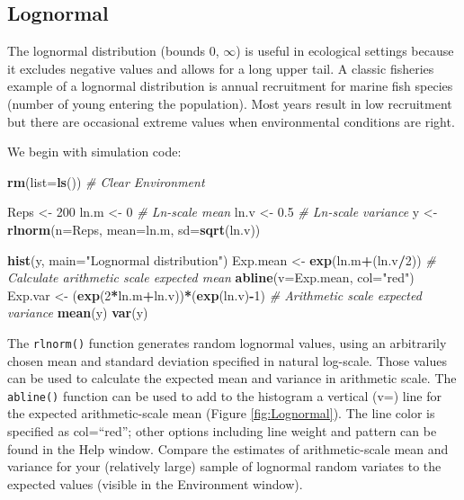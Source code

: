 \documentclass[
]{krantz}
\makeatletter
\newenvironment{Shaded}{\begin{snugshade}}{\end{snugshade}}
\newcommand{\AttributeTok}[1]{\textcolor[rgb]{0.27,0.27,0.27}{#1}}
\newcommand{\CommentTok}[1]{\textcolor[rgb]{0.37,0.37,0.37}{\textit{#1}}}
\newcommand{\DecValTok}[1]{\textcolor[rgb]{0.06,0.06,0.06}{#1}}
\newcommand{\FloatTok}[1]{\textcolor[rgb]{0.06,0.06,0.06}{#1}}
\newcommand{\FunctionTok}[1]{\textcolor[rgb]{0.27,0.27,0.27}{\textbf{#1}}}
\newcommand{\NormalTok}[1]{#1}
\newcommand{\OtherTok}[1]{\textcolor[rgb]{0.37,0.37,0.37}{#1}}
\newcommand{\SpecialCharTok}[1]{\textcolor[rgb]{0.43,0.43,0.43}{\textbf{#1}}}
\newcommand{\StringTok}[1]{\textcolor[rgb]{0.5,0.5,0.5}{#1}}
\newenvironment{kframe}{%
\medskip{}
\setlength{\fboxsep}{.8em}
 \def\at@end@of@kframe{}%
 \ifinner\ifhmode%
  \def\at@end@of@kframe{\end{minipage}}%
  \begin{minipage}{\columnwidth}%
 \fi\fi%
 \def\FrameCommand##1{\hskip\@totalleftmargin \hskip-\fboxsep
 \colorbox{shadecolor}{##1}\hskip-\fboxsep
     \hskip-\linewidth \hskip-\@totalleftmargin \hskip\columnwidth}%
 \MakeFramed {\advance\hsize-\width
   \@totalleftmargin\z@ \linewidth\hsize
   \@setminipage}}%
 {\par\unskip\endMakeFramed%
 \at@end@of@kframe}
\renewenvironment{Shaded}{\begin{kframe}}{\end{kframe}}
\makeatother
\begin{document}
\hypertarget{lognormal}{%
\subsection{Lognormal}\label{lognormal}}

The lognormal distribution (bounds 0, \(\infty\)) is useful in ecological settings because it excludes negative values and allows for a long upper tail. A classic fisheries example of a lognormal distribution is annual recruitment for marine fish species (number of young entering the population). Most years result in low recruitment but there are occasional extreme values when environmental conditions are right.

We begin with simulation code:

\begin{Shaded}
\begin{Highlighting}[]
\FunctionTok{rm}\NormalTok{(}\AttributeTok{list=}\FunctionTok{ls}\NormalTok{()) }\CommentTok{\# Clear Environment}

\NormalTok{Reps }\OtherTok{\textless{}{-}} \DecValTok{200}
\NormalTok{ln.m }\OtherTok{\textless{}{-}} \DecValTok{0} \CommentTok{\# Ln{-}scale mean}
\NormalTok{ln.v }\OtherTok{\textless{}{-}} \FloatTok{0.5} \CommentTok{\# Ln{-}scale variance}
\NormalTok{y }\OtherTok{\textless{}{-}} \FunctionTok{rlnorm}\NormalTok{(}\AttributeTok{n=}\NormalTok{Reps, }\AttributeTok{mean=}\NormalTok{ln.m, }\AttributeTok{sd=}\FunctionTok{sqrt}\NormalTok{(ln.v))}

\FunctionTok{hist}\NormalTok{(y, }\AttributeTok{main=}\StringTok{"Lognormal distribution"}\NormalTok{)}
\NormalTok{Exp.mean }\OtherTok{\textless{}{-}} \FunctionTok{exp}\NormalTok{(ln.m}\SpecialCharTok{+}\NormalTok{(ln.v}\SpecialCharTok{/}\DecValTok{2}\NormalTok{)) }\CommentTok{\# Calculate arithmetic scale expected mean}
\FunctionTok{abline}\NormalTok{(}\AttributeTok{v=}\NormalTok{Exp.mean, }\AttributeTok{col=}\StringTok{"red"}\NormalTok{)}
\NormalTok{Exp.var }\OtherTok{\textless{}{-}}\NormalTok{ (}\FunctionTok{exp}\NormalTok{(}\DecValTok{2}\SpecialCharTok{*}\NormalTok{ln.m}\SpecialCharTok{+}\NormalTok{ln.v))}\SpecialCharTok{*}\NormalTok{(}\FunctionTok{exp}\NormalTok{(ln.v)}\SpecialCharTok{{-}}\DecValTok{1}\NormalTok{) }\CommentTok{\# Arithmetic scale expected variance}
\FunctionTok{mean}\NormalTok{(y)}
\FunctionTok{var}\NormalTok{(y)}
\end{Highlighting}
\end{Shaded}

The \texttt{rlnorm()} function generates random lognormal values, using an arbitrarily chosen mean and standard deviation specified in natural log-scale. Those values can be used to calculate the expected mean and variance in arithmetic scale. The \texttt{abline()} function can be used to add to the histogram a vertical (v=) line for the expected arithmetic-scale mean (Figure \ref{fig:Lognormal}). The line color is specified as col=``red''; other options including line weight and pattern can be found in the Help window. Compare the estimates of arithmetic-scale mean and variance for your (relatively large) sample of lognormal random variates to the expected values (visible in the Environment window).
\end{document}
